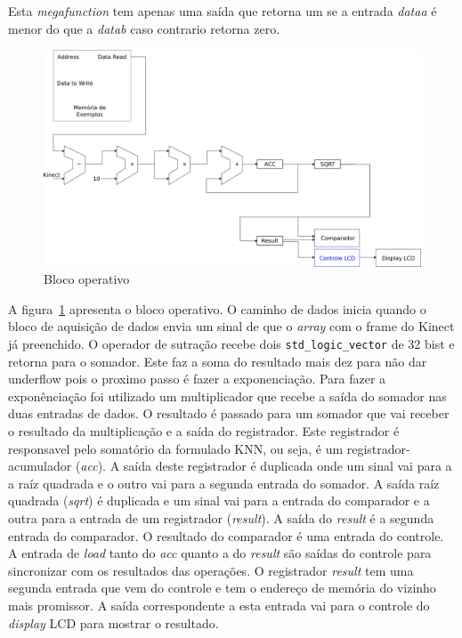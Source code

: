 Esta \textit{megafunction} tem apenas uma saída que retorna um se a entrada
\textit{dataa} é menor do que a \textit{datab} caso contrario retorna zero.

\begin{figure}[h]
\centering
\includegraphics[width=.7\textwidth]{../apresentacao/knn_sem_controle}
\caption{Bloco operativo}
\label{fig:blocoperativo}
\end{figure}

A figura~\ref{fig:blocoperativo} apresenta o bloco operativo. O caminho de
dados inicia quando o bloco de aquisição de dados envia um sinal de que o 
\textit{array} com o frame do Kinect já preenchido.
O operador de sutração recebe dois \verb|std_logic_vector| de 32 bist e retorna
para o somador. Este faz a soma do resultado mais dez para não dar underflow
pois o proximo passo é fazer a exponenciação. Para fazer a exponênciação foi 
utilizado um multiplicador que recebe a saída do somador nas duas entradas de
dados. O resultado é passado para um somador que vai receber o resultado da 
multiplicação e a saída do registrador. Este registrador é responsavel pelo
somatório da formulado KNN, ou seja, é um registrador-acumulador 
(\textit{acc}). A saída deste registrador é duplicada onde um sinal vai para 
a a raíz quadrada e o outro vai para a segunda entrada do somador. A saída raíz
quadrada (\textit{sqrt}) é duplicada e um sinal vai para a entrada do
comparador e a outra para a entrada de um registrador (\textit{result}). A
saída do \textit{result} é a segunda entrada do comparador. O resultado do
comparador é uma entrada do controle. A entrada de \textit{load} tanto do 
\textit{acc} quanto a do \textit{result} são saídas do controle para
sincronizar com os resultados das operações. O registrador \textit{result} tem
uma segunda entrada que vem do controle e tem o endereço de memória do vizinho
mais promissor. A saída correspondente a esta entrada vai para o controle do 
\textit{display} LCD para mostrar o resultado.